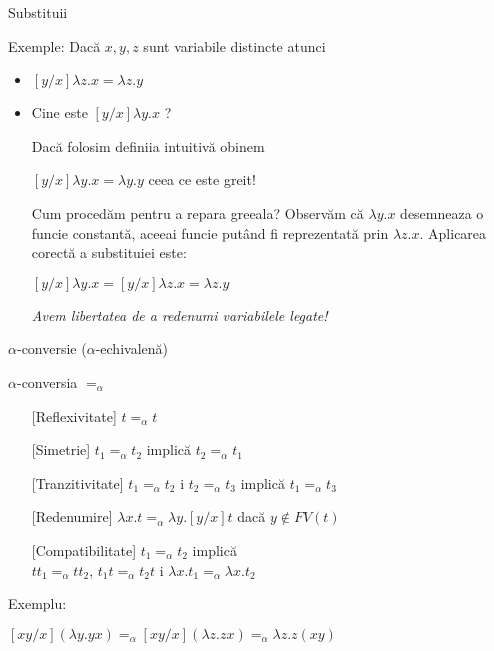 \documentclass[xcolor=pdftex,romanian,colorlinks]{beamer}
\begin{document}
\begin{frame}[fragile]{ Substitu\ts ii}

Exemple:
Dac\u a $x,y,z$ sunt variabile distincte atunci
\begin{itemize}
\item $[y/x]\lambda z. x=\lambda z. y$ 
 \medskip
 
\item  Cine este $[y/x] \lambda y.x$ ?\pause

Dac\u a  folosim defini\ts ia intuitiv\u a ob\ts inem 

$[y/x] \lambda y.x = \lambda y. y$ ceea ce este gre\sh it!\pause


\medskip
Cum proced\u am pentru a repara gre\sh eala? Observ\u am c\u a $\lambda y.x$ desemneaza o func\ts ie constant\u a, aceea\sh i func\ts ie put\^{a}nd fi reprezentat\u a  prin $\lambda z.x$. Aplicarea corect\u a a substitu\ts iei este:

   $[y/x] \lambda y.x=[y/x] \lambda z.x=\lambda z.y$
   
   \pause\medskip
   
   
 {\it Avem libertatea de a redenumi variabilele legate!}
\end{itemize}
\end{frame}

\begin{frame}[fragile]{$\alpha$-conversie ($\alpha$-echivalen\ts \u a)}
\begin{block}{$\alpha$-conversia $=_\alpha$ }
\begin{itemize}
\item[][Reflexivitate] $t=_\alpha t$
\item[][Simetrie]   $t_1=_\alpha t_2$ implic\u a $t_2=_\alpha t_1$
\item[][Tranzitivitate] $t_1=_\alpha t_2$ \sh i $t_2=_\alpha t_3$ implic\u a $t_1=_\alpha t_3$
\item[][Redenumire] $\lambda x.t =_\alpha \lambda y. [y/x]t$ dac\u a $y\not\in FV(t)$
\item[][Compatibilitate]  $t_1=_\alpha t_2$ implic\u a \\
 \hspace*{3cm} $tt_1=_\alpha tt_2$, $t_1t=_\alpha t_2t$ \sh i 
$\lambda x.t_1=_\alpha\lambda x.t_2$ 
\end{itemize}
\end{block}
\pause
Exemplu:

$[xy/x](\lambda y. yx)=_\alpha [xy/x](\lambda z. zx)=_\alpha \lambda z. z(xy) $
\end{frame}
\end{document}
